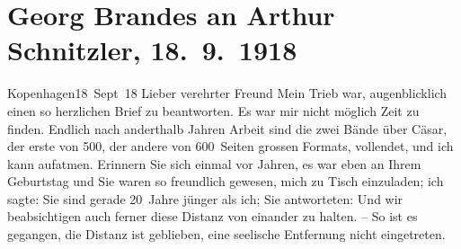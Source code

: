 

               \section[Georg Brandes an Arthur Schnitzler, 18. 9. 1918]{ Georg Brandes an Arthur Schnitzler, 18. 9. 1918}\nopagebreak{}\rehead{ }\begin{ledgroupsized}[t]{13cm}\normalsize\beginnumbering{} \toendnotes[C]{\smallbreak\pagebreak[2]} 
\toendnotes[C]{\smallbreak}\pstart
           \raggedleft{}{\pb}Kopenhagen18 Sept 18\pend
           \pstart{}Lieber verehrter Freund\pend\pstart
           Mein Trieb war, augenblicklich einen so herzlichen Brief zu beantworten. Es war
                    mir nicht möglich Zeit zu finden. Endlich nach anderthalb Jahren Arbeit sind die
                        zwei Bände über Cäsar, der erste von 500, der andere von 600 Seiten grossen Formats, vollendet,
                    und ich kann aufatmen.\pend
           \pstart
           Erinnern Sie sich einmal vor Jahren, es war eben an Ihrem Geburtstag und Sie
                    waren so freundlich gewesen, mich zu Tisch einzuladen; ich sagte: Sie sind
                    gerade 20 Jahre jünger als ich; Sie antworteten: Und wir beabsichtigen auch
                    ferner diese Distanz von einander zu halten. – So ist es gegangen, die Distanz
                    ist geblieben, eine seelische Entfernung nicht eingetreten.\pend

\end{ledgroupsized}

